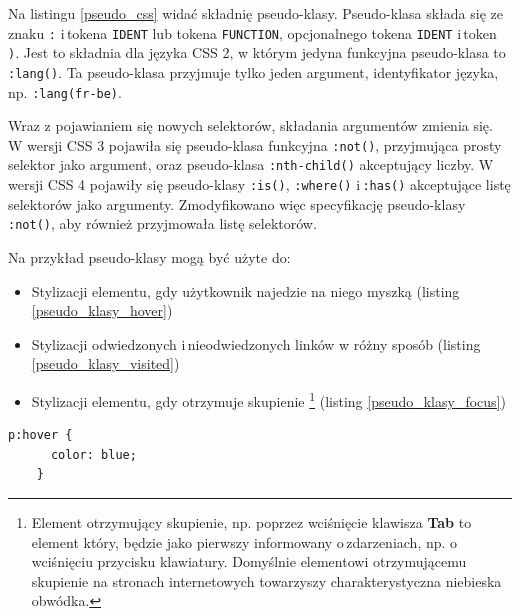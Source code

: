 \documentclass[a4paper,12pt]{book} %
\begin{document}
Na listingu \ref{pseudo_css} widać składnię pseudo-klasy. Pseudo-klasa składa się ze znaku \lstinline|:| i\,tokena \lstinline|IDENT| lub tokena \lstinline|FUNCTION|, opcjonalnego tokena \lstinline|IDENT| i\,token \lstinline|)|. Jest to składnia dla języka CSS 2, w którym jedyna funkcyjna pseudo-klasa to \lstinline|:lang()|. Ta pseudo-klasa przyjmuje tylko jeden argument, identyfikator języka, np. \lstinline|:lang(fr-be)|.

Wraz z pojawianiem się nowych selektorów, składania argumentów zmienia się. W wersji CSS 3 pojawiła się pseudo-klasa funkcyjna \lstinline|:not()|, przyjmująca prosty selektor jako argument, oraz pseudo-klasa \lstinline{:nth-child()} akceptujący liczby. W wersji CSS 4 pojawiły się pseudo-klasy \lstinline|:is()|, \lstinline|:where()| i\,\lstinline|:has()| akceptujące listę selektorów jako argumenty. Zmodyfikowano więc specyfikację pseudo-klasy \lstinline|:not()|, aby również przyjmowała listę selektorów.

Na przykład pseudo-klasy mogą być użyte do:
\begin{itemize}
  \item Stylizacji elementu, gdy użytkownik najedzie na niego myszką (listing \ref{pseudo_klasy_hover})
  \item Stylizacji odwiedzonych i\,nieodwiedzonych linków w różny sposób (listing \ref{pseudo_klasy_visited})
  \item Stylizacji elementu, gdy otrzymuje skupienie \footnote{Element otrzymujący skupienie, np. poprzez wciśnięcie klawisza \textbf{Tab} to element który, będzie jako pierwszy informowany o\,zdarzeniach, np. o\,wciśnięciu przycisku klawiatury. Domyślnie elementowi otrzymującemu skupienie na stronach internetowych towarzyszy charakterystyczna niebieska obwódka.} (listing \ref{pseudo_klasy_focus})
\end{itemize}



\begin{lstfloat}[hb]
  \lstset{language=HTML}
  \begin{lstlisting}[frame=single]
    p:hover {
      color: blue;
    }\end{lstlisting}

  \caption{Reguła z selektorem akapitu, na który użytkownik najedzie myszką}
  \label{pseudo_klasy_hover}

\end{lstfloat}
\end{document}

